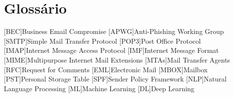\chapter{Glossário}

\footnotesize
\SingleSpacing

\begin{multicols}{2}
\begin{acronym}[AAAAAA]

	[BEC]{Business Email Compromise}
    [APWG]{Anti-Phishing Working Group}
	[SMTP]{Simple Mail Transfer Protocol}
	[POP3]{Post Office Protocol}
	[IMAP]{Internet Message Access Protocol}
	[IMF]{Internet Message Format}
	[MIME]{Multipurpose Internet Mail Extensions}
	[MTAs]{Mail Transfer Agents}
	[RFC]{Request for Comments}
	[EML]{Electronic Mail}
	[MBOX]{Mailbox}
	[PST]{Personal Storage Table}
	[SPF]{Sender Policy Framework}
	[NLP]{Natural Language Processing}
	[ML]{Machine Learning}
	[DL]{Deep Learning}
 

\end{acronym}
\end{multicols}

